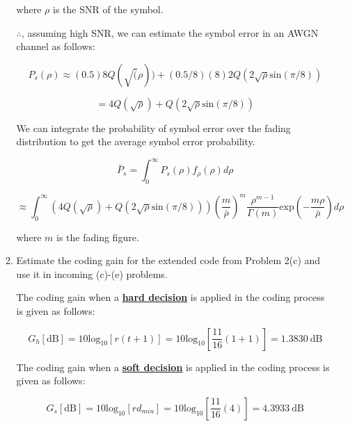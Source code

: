 \documentclass[fleqn]{article}
\begin{document}
\begin{enumerate}
\begin{enumerate}
			where $\rho$ is the SNR of the symbol.
			
			$\therefore$, assuming high SNR, we can estimate the symbol error in an AWGN channel as follows:
			
			\begin{equation*}
				P_s(\rho) \approx (0.5)8Q(\sqrt(\rho)) + (0.5/8)(8)2Q(2\sqrt{\rho}\text{sin}(\pi/8))
			\end{equation*}
			
			\begin{equation*}
				= 4Q(\sqrt{\rho}) + Q(2\sqrt{\rho}\text{sin}(\pi/8))
			\end{equation*}
			
			We can integrate the probability of symbol error over the fading distribution to get the average symbol error probability.
			
			\begin{equation*}
				\bar{P}_s = \int_{0}^{\infty}{P_s(\rho)f_{\rho}(\rho)d\rho}
			\end{equation*}
			
			\begin{equation*}
				\approx \int_{0}^{\infty}{(4Q(\sqrt{\rho}) + Q(2\sqrt{\rho}\text{sin}(\pi/8)))\left(\frac{m}{\bar{\rho}}\right)^m\frac{\rho^{m-1}}{\Gamma(m)}\text{exp}\left(-\frac{m\rho}{\bar{\rho}}\right)d\rho}
			\end{equation*}
			
			where $m$ is the fading figure.
			
			\item Estimate the coding gain for the extended code from Problem 2(c) and use it in incoming (c)-(e) problems.
			
			The coding gain when a \textbf{\underline{hard decision}} is applied in the coding process is given as follows:
			
			\begin{equation*}
				G_h[\text{dB}] = 10\text{log}_{10}[r(t+1)] = 10\text{log}_{10}\left[\frac{11}{16}(1+1)\right] = 1.3830 \ \text{dB}
			\end{equation*}
				
			The coding gain when a \textbf{\underline{soft decision}} is applied in the coding process is given as follows:
			
			\begin{equation*}
				G_s[\text{dB}] = 10\text{log}_{10}[rd_{min}] = 10\text{log}_10\left[\frac{11}{16}(4)\right] = 4.3933 \ \text{dB}
			\end{equation*}
			

\end{enumerate}
\end{enumerate}
\end{document}
